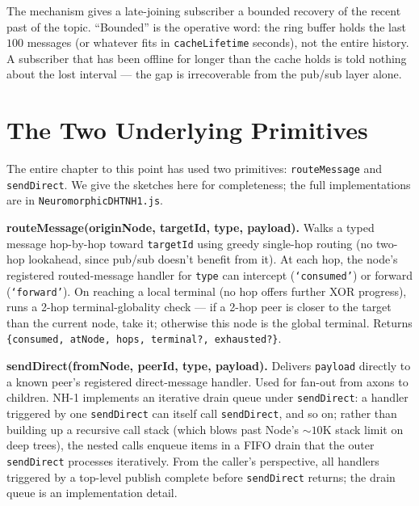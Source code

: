 \documentclass[twoside,nobib]{tufte-book}
\begin{document}
The mechanism gives a late-joining subscriber a bounded recovery
of the recent past of the topic. ``Bounded'' is the operative
word: the ring buffer holds the last $100$ messages (or whatever
fits in \texttt{cacheLifetime} seconds), not the entire
history. A subscriber that has been offline for longer than the
cache holds is told nothing about the lost interval --- the gap
is irrecoverable from the pub/sub layer alone.

\section{The Two Underlying Primitives}

The entire chapter to this point has used two primitives:
\texttt{routeMessage} and \texttt{sendDirect}. We give the
sketches here for completeness; the full implementations are in
\texttt{NeuromorphicDHTNH1.js}.

\textbf{routeMessage(originNode, targetId, type, payload).} Walks
a typed message hop-by-hop toward \texttt{targetId} using greedy
single-hop routing (no two-hop lookahead, since pub/sub doesn't
benefit from it). At each hop, the node's registered routed-message
handler for \texttt{type} can intercept (\texttt{`consumed'}) or
forward (\texttt{`forward'}). On reaching a local terminal (no
hop offers further XOR progress), runs a 2-hop terminal-globality
check ---
if a 2-hop peer is closer to the target than the current node,
take it; otherwise this node is the global terminal. Returns
\texttt{\{consumed, atNode, hops, terminal?, exhausted?\}}.

\textbf{sendDirect(fromNode, peerId, type, payload).} Delivers
\texttt{payload} directly to a known peer's registered
direct-message handler. Used for fan-out from axons to children.
NH-1 implements an iterative drain queue under
\texttt{sendDirect}: a handler triggered by one
\texttt{sendDirect} can itself call \texttt{sendDirect}, and so
on; rather than building up a recursive call stack (which blows
past Node's $\sim 10\mathrm{K}$ stack limit on deep trees), the
nested calls enqueue items in a FIFO drain that the outer
\texttt{sendDirect} processes iteratively. From the caller's
perspective, all handlers triggered by a top-level publish
complete before \texttt{sendDirect} returns; the drain queue is
an implementation detail.
\end{document}
